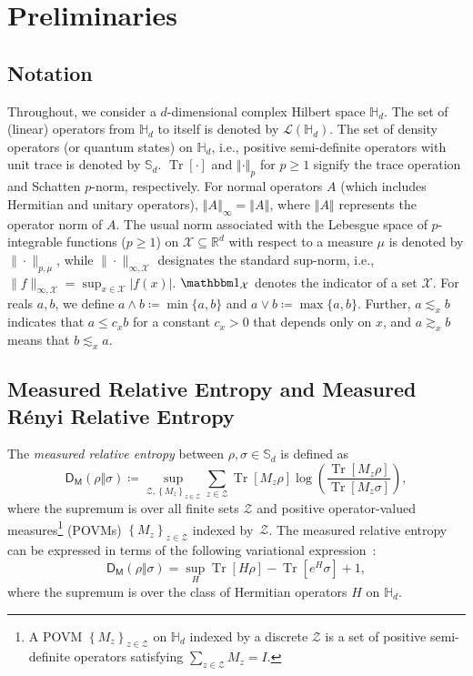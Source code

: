 \documentclass[a4paper,onecolumn,11pt,accepted=2026-05-12]{quantumarticle}
\newcommand{\norm}[1]{\left\Vert#1\right\Vert}
\newcommand{\abs}[1]{\left\vert#1\right\vert}
\newcommand{\sD}{\mathsf{D}}
\newcommand{\cL}{\mathcal{L}}
\newcommand{\cX}{\mathcal{X}}
\newcommand{\cZ}{\mathcal{Z}}
\newcommand{\HH}{\mathbb{H}}
\newcommand{\RR}{\mathbb{R}}
\newcommand{\ind}{\mathbbm 1}
\begin{document}
\section{Preliminaries} \label{Sec:Preliminaries}
\subsection*{Notation}
Throughout, we consider a $d$-dimensional complex Hilbert space $\HH_d$. The set of (linear) operators from $\HH_d$  to itself is denoted by  $\cL(\HH_d)$. The set of density operators (or quantum states) on $\HH_d$, i.e., positive semi-definite operators with unit trace is denoted by $\mathbb{S}_d $. 
$\operatorname{Tr}[\cdot]$ and $\norm{\cdot}_p$ for $p \geq 1$ signify the trace operation   and Schatten $p$-norm, respectively. For normal operators $A$ (which includes Hermitian and unitary operators), $\norm{A}_{\infty}=\norm{A}$, where $\norm{A}$ represents  the operator norm of $A$. The usual norm associated with the Lebesgue space of $p$-integrable functions ($p  \geq 1$) on $\cX \subseteq \RR^d$ with respect to a measure $\mu$ is denoted by $\| \cdot \|_{p,\mu}$, while $\|\cdot\|_{\infty,\cX}$ designates the standard sup-norm, i.e., $\|f\|_{\infty,\cX}=\sup_{x \in \cX} \abs{f(x)}$.  
$\ind_{\cX}$ denotes the indicator of a set $\cX$.
For reals $a,b$, we define $a \wedge b \coloneqq \min\{a,b\}$ and $a \vee b \coloneqq \max\{a,b\}$. Further, $a\lesssim_x b$ indicates that $a \leq c_x b$ for a  constant $c_x>0$ that depends only on $x$, and  $a\gtrsim_x b$ means that $b \lesssim_x a$. 
\subsection{Measured  Relative Entropy and Measured R\'enyi Relative  Entropy}\label{Sec:measured-rel-entropies}
The \emph{measured relative entropy} between $\rho,\sigma \in \mathbb{S}_d$ is defined as~\cite{Donald1986,P09}
\begin{equation}
\sD_{\mathsf{M}}(\rho\Vert\sigma)\coloneqq\sup_{\cZ,\left\{  M_z\right\}  _{z\in\cZ}}
\sum_{z\in\cZ}\operatorname{Tr}[M_z\rho]\log \!\left(  \frac{\operatorname{Tr}
[M_z\rho]}{\operatorname{Tr}[M_z\sigma]}\right),
\label{eq:measured-rel-def}
\end{equation}
where the supremum is over all finite sets $\cZ$ and positive operator-valued measures\footnote{A POVM $\left\{  M_z\right\}_{z\in\cZ}$  on $\HH_d$ indexed by a discrete $\cZ$ is a set of positive semi-definite operators satisfying $\sum_{z \in \cZ} M_z = I$.} (POVMs) $\left\{  M_z\right\}_{z\in\cZ}$ indexed by~$\cZ$.
The measured relative entropy can be expressed in terms of the following variational expression~\cite[Lemma~1]{Berta2015OnEntropies}: 
\begin{equation}
\sD_{\mathsf{M}}(\rho\Vert\sigma)  =\sup_{H}\operatorname{Tr}[H\rho
]-\operatorname{Tr}[e^H\sigma]+1,\label{eq:rel_ent_variational} 
\end{equation}
where the supremum is over the class of Hermitian operators $H$ on $\HH_d$. 
\end{document}
